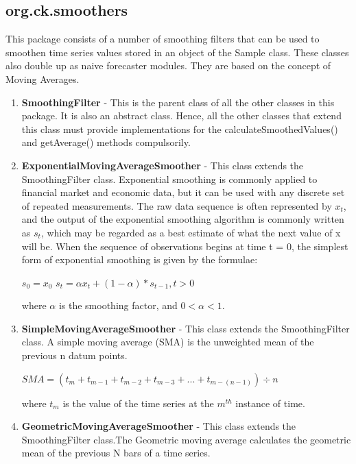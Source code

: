 \documentclass[12pt,a4paper]{report}
\begin{document}
\subsection{org.ck.smoothers}
This package consists of a number of smoothing filters that can be used to smoothen time series values stored in an object of the Sample class. These classes also double up as naive forecaster modules. They are based on the concept of Moving Averages.

\begin{enumerate}
\item{\textbf{SmoothingFilter} - This is the parent class of all the other classes in this package. It is also an abstract class. Hence, all the other classes that extend this class must provide implementations for the calculateSmoothedValues() and getAverage() methods compulsorily.}

\item{\textbf{ExponentialMovingAverageSmoother} - This class extends the SmoothingFilter class. Exponential smoothing is commonly applied to financial market and economic data, but it can be used with any discrete set of repeated measurements. The raw data sequence is often represented by $x_t$, and the output of the exponential smoothing algorithm is commonly written as $s_t$, which may be regarded as a best estimate of what the next value of x will be. When the sequence of observations begins at time t = 0, the simplest form of exponential smoothing is given by the formulae:

$s_0 = x_0$
$s_t = \alpha x_t + (1 - \alpha) * s_{t-1} , t > 0$

where $\alpha$ is the smoothing factor, and $0 < \alpha < 1$.}

\item{\textbf{SimpleMovingAverageSmoother} - This class extends the SmoothingFilter class. A simple moving average (SMA) is the unweighted mean of the previous n datum points.

$SMA = (t_m + t_{m-1} + t_{m-2} + t_{m-3} + ... + t_{m-(n-1)}) \div n$

where $t_m$ is the value of the time series at the $m^{th}$ instance of time.

}

\item{\textbf{GeometricMovingAverageSmoother} - This class extends the SmoothingFilter class.The Geometric moving average calculates the geometric mean of the previous N bars of a time series.}

\end{enumerate}
\end{document}
